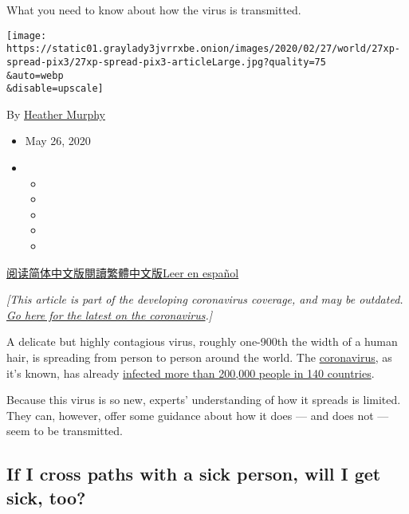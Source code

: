 What you need to know about how the virus is transmitted.

\texttt{[image: https://static01.graylady3jvrrxbe.onion/images/2020/02/27/world/27xp-spread-pix3/27xp-spread-pix3-articleLarge.jpg?quality=75\\\&auto=webp\\\&disable=upscale]}

By \href{https://www.nytimes3xbfgragh.onion/by/heather-murphy}{Heather
Murphy}

\begin{itemize}
\item
  May 26, 2020
\item
  \begin{itemize}
  \item
  \item
  \item
  \item
  \item
  \end{itemize}
\end{itemize}

\href{https://cn.nytimes3xbfgragh.onion/health/20200303/coronavirus-how-it-spreads/}{阅读简体中文版}\href{https://cn.nytimes3xbfgragh.onion/health/20200303/coronavirus-how-it-spreads/zh-hant/}{閱讀繁體中文版}\href{https://www.nytimes3xbfgragh.onion/es/2020/03/03/espanol/ciencia-y-tecnologia/coronavirus-como-se-transmite.html}{Leer
en español}

\emph{{[}This article is part of the developing coronavirus coverage,
and may be outdated.}
\href{https://www.nytimes3xbfgragh.onion/news-event/coronavirus}{\emph{Go
here for the latest on the coronavirus}}\emph{.{]}}

A delicate but highly contagious virus, roughly one-900th the width of a
human hair, is spreading from person to person around the world. The
\href{https://www.nytimes3xbfgragh.onion/2020/03/03/world/coronavirus-news.html}{coronavirus},
as it's known, has already
\href{https://www.nytimes3xbfgragh.onion/interactive/2020/world/coronavirus-maps.html}{infected
more than 200,000 people in 140 countries}.

Because this virus is so new, experts' understanding of how it spreads
is limited. They can, however, offer some guidance about how it does ---
and does not --- seem to be transmitted.

\hypertarget{if-i-cross-paths-with-a-sick-person-will-i-get-sick-too}{%
\subsection{If I cross paths with a sick person, will I get sick,
too?}\label{if-i-cross-paths-with-a-sick-person-will-i-get-sick-too}}

